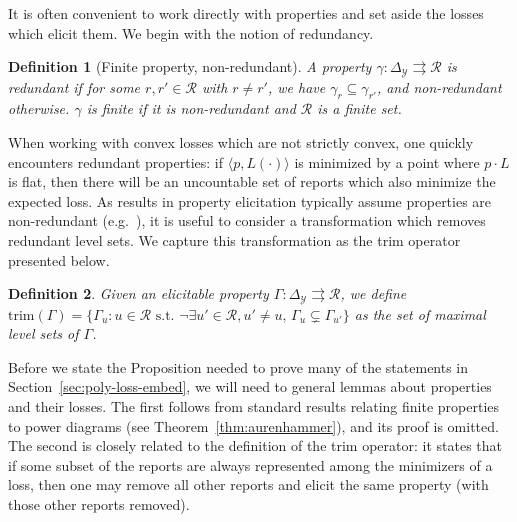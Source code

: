 \documentclass[12pt]{article}
\newcommand{\Comments}{1}
\newcommand{\mynote}[2]{\ifnum\Comments=1\textcolor{#1}{#2}\fi}
\newcommand{\mytodo}[2]{\ifnum\Comments=1%
  \todo[linecolor=#1!80!black,backgroundcolor=#1,bordercolor=#1!80!black]{#2}\fi}
\newcommand{\jessie}[1]{\mynote{purple}{[JF: #1]}}
\newcommand{\btw}[1]{\mytodo{gray!20!white}{[BTW: #1]}}%
\newcommand{\simplex}{\Delta_\Y}
\newcommand{\R}{\mathcal{R}}
\newcommand{\Y}{\mathcal{Y}}
\newcommand{\inprod}[2]{\langle #1, #2 \rangle}%
\newcommand{\toto}{\rightrightarrows}
\newcommand{\trim}{\mathrm{trim}}
\newtheorem{definition}{Definition}
\begin{document}
It is often convenient to work directly with properties and set aside the losses which elicit them.
We begin with the notion of redundancy.
\begin{definition}[Finite property, non-redundant]
	A property $\gamma:\simplex\toto\R$ is \emph{redundant} if for some $r,r'\in\R$ with $r \neq r'$, we have $\gamma_r \subseteq \gamma_{r'}$, and \emph{non-redundant} otherwise.
	$\gamma$ is \emph{finite} if it is non-redundant and $\R$ is a finite set.
\end{definition}

When working with convex losses which are not strictly convex, one quickly encounters redundant properties: if $\inprod{p}{L(\cdot)}$ is minimized by a point where $p\cdot L$ is flat, then there will be an uncountable set of reports which also minimize the expected loss.
As results in property elicitation typically assume properties are non-redundant (e.g.~\cite{frongillo2014general,frongillo2015elicitation}), it is useful to consider a transformation which removes redundant level sets.
We capture this transformation as the trim operator presented below.

\begin{definition}\label{def:trim}
	Given an elicitable property $\Gamma:\simplex \toto\R$, we define $\trim(\Gamma) = \{\Gamma_u : u \in \R \text{ s.t. } \neg\exists u'\in\R,u'\neq u,\, \Gamma_u \subsetneq \Gamma_{u'}\}$ as the set of maximal level sets of $\Gamma$.
\end{definition}



Before we state the Proposition needed to prove many of the statements in Section~\ref{sec:poly-loss-embed}, we will need to general lemmas about properties and their losses.
The first follows from standard results relating finite properties to power diagrams (see Theorem~\ref{thm:aurenhammer}), and its proof is omitted.
The second is closely related to the definition of the trim operator: it states that if some subset of the reports are always represented among the minimizers of a loss, then one may remove all other reports and elicit the same property (with those other reports removed).
\end{document}
